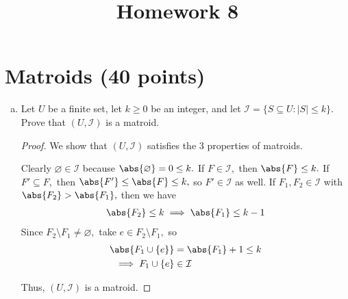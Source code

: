 \documentclass{article}
\begin{document}
\title{Homework 8}
\maketitle
\thispagestyle{fancy}

\section{Matroids (40 points)}

\begin{enumerate}[(a)]
	\item Let $U$ be a finite set, let $k \geq 0$ be an integer, and let $\mathcal I = \{ S \subseteq U : |S| \leq k\}$.  Prove that $(U, \mathcal I)$ is a matroid.
		\begin{proof}
			We show that $(U, \mathcal I)$ satisfies the 3 properties of matroids.
			\begin{enumerate}[(i)]
				\ii Clearly $\varnothing\in\mathcal I$ because $\abs{\varnothing}=0\le k.$
				\ii If $F\in\mathcal I,$ then $\abs{F}\le k.$ If $F'\subseteq F,$ then $\abs{F'}\le \abs{F}\le k,$ so $F'\in\mathcal I$ as well.
				\ii If $F_1, F_2\in\mathcal I$ with $\abs{F_2}>\abs{F_1},$ then we have
				\begin{align*}
					\abs{F_2}\le k\implies \abs{F_1}\le k-1
				\end{align*}
				Since $F_2\setminus F_1\neq \varnothing,$ take $e\in F_2\setminus F_1,$ so 
				\begin{align*}
					\abs{F_1\cup \left\{ e \right\}} &= \abs{F_1} + 1 \le k \\
					\implies F_1\cup\left\{ e \right\} &\in \mathcal I
				\end{align*}
			\end{enumerate}
			Thus, $(U, \mathcal I)$ is a matroid.
		\end{proof}


\end{enumerate}
\end{document}

